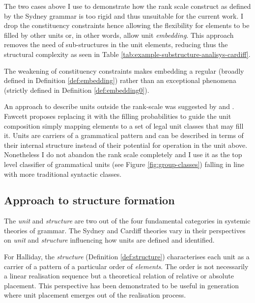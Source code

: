     
    The two cases above I use to demonstrate how the rank scale construct as defined by the Sydney grammar is too rigid and thus unsuitable for the current work. 
    I drop the constituency constraints hence allowing the flexibility for elements to be filled by other units or, in other words, allow unit \textit{embedding}. This approach removes the need of sub-structures in the unit elements, reducing thus the structural complexity as seen in Table \ref{tab:example-substructure-analisys-cardiff}.
    
    
    The weakening of constituency constraints makes embedding a regular (broadly defined in Definition \ref{def:embedding}) rather than an exceptional phenomena (strictly defined in Definition \ref{def:embedding0}). 

    An approach to describe units outside the rank-scale was suggested by \cite{Fawcett2000} and \cite{Butler1985}. Fawcett proposes replacing it with the filling probabilities to guide the unit composition simply mapping elements to a set of legal unit classes that may fill it. Units are carriers of a grammatical pattern and can be described in terms of their internal structure instead of their potential for operation in the unit above. Nonetheless I do not abandon the rank scale completely and I use it as the top level classifier of grammatical units (see Figure \ref{fig:group-classes}) falling in line with more traditional syntactic classes.
    
\subsection{Approach to structure formation}
    The \textit{unit} and \textit{structure} are two out of the four fundamental categories in systemic theories of grammar. The Sydney and Cardiff theories vary in their perspectives on \textit{unit} and \textit{structure} influencing how units are defined and identified.
    
    For Halliday, the \textit{structure} (Definition \ref{def:structure}) characterises each unit as a carrier of a pattern of a particular order of \textit{elements}. The order is not necessarily a linear realisation sequence but a theoretical relation of relative or absolute placement. This perspective has been demonstrated to be useful in generation where unit placement emerges out of the realisation process.

